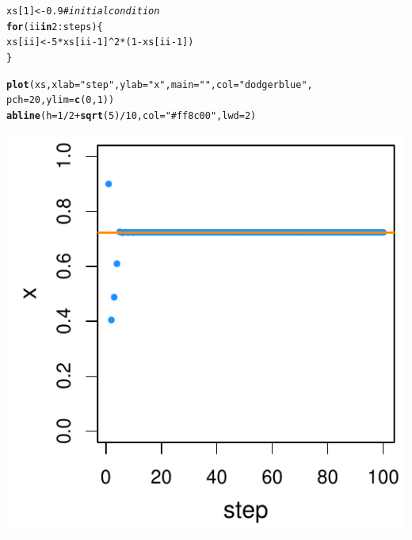 \documentclass[Tutorial]{../cbg}\usepackage[]{graphicx}\usepackage[]{color}
\makeatletter
\def\maxwidth{ %
  \ifdim\Gin@nat@width>\linewidth
    \linewidth
  \else
    \Gin@nat@width
  \fi
}
\newcommand{\hlnum}[1]{\textcolor[rgb]{0.686,0.059,0.569}{#1}}%
\newcommand{\hlstr}[1]{\textcolor[rgb]{0.192,0.494,0.8}{#1}}%
\newcommand{\hlcom}[1]{\textcolor[rgb]{0.678,0.584,0.686}{\textit{#1}}}%
\newcommand{\hlopt}[1]{\textcolor[rgb]{0,0,0}{#1}}%
\newcommand{\hlstd}[1]{\textcolor[rgb]{0.345,0.345,0.345}{#1}}%
\newcommand{\hlkwa}[1]{\textcolor[rgb]{0.161,0.373,0.58}{\textbf{#1}}}%
\newcommand{\hlkwb}[1]{\textcolor[rgb]{0.69,0.353,0.396}{#1}}%
\newcommand{\hlkwc}[1]{\textcolor[rgb]{0.333,0.667,0.333}{#1}}%
\newcommand{\hlkwd}[1]{\textcolor[rgb]{0.737,0.353,0.396}{\textbf{#1}}}%
\newenvironment{kframe}{%
 \def\at@end@of@kframe{}%
 \ifinner\ifhmode%
  \def\at@end@of@kframe{\end{minipage}}%
  \begin{minipage}{\columnwidth}%
 \fi\fi%
 \def\FrameCommand##1{\hskip\@totalleftmargin \hskip-\fboxsep
 \colorbox{shadecolor}{##1}\hskip-\fboxsep
     \hskip-\linewidth \hskip-\@totalleftmargin \hskip\columnwidth}%
 \MakeFramed {\advance\hsize-\width
   \@totalleftmargin\z@ \linewidth\hsize
   \@setminipage}}%
 {\par\unskip\endMakeFramed%
 \at@end@of@kframe}
\newenvironment{knitrout}{}{} %
\makeatother
\begin{document}
\begin{knitrout}
\color{fgcolor}\begin{kframe}
\begin{alltt}
\hlstd{xs[}\hlnum{1}\hlstd{]} \hlkwb{<-} \hlnum{0.9}  \hlcom{# initial condition}
\hlkwa{for} \hlstd{(ii} \hlkwa{in} \hlnum{2}\hlopt{:}\hlstd{steps) \{}
    \hlstd{xs[ii]} \hlkwb{<-} \hlnum{5} \hlopt{*} \hlstd{xs[ii} \hlopt{-} \hlnum{1}\hlstd{]}\hlopt{^}\hlnum{2} \hlopt{*} \hlstd{(}\hlnum{1} \hlopt{-} \hlstd{xs[ii} \hlopt{-} \hlnum{1}\hlstd{])}
\hlstd{\}}
\end{alltt}
\end{kframe}
\end{knitrout}


\begin{knitrout}
\color{fgcolor}\begin{kframe}
\begin{alltt}
\hlkwd{plot}\hlstd{(xs,} \hlkwc{xlab} \hlstd{=} \hlstr{"step"}\hlstd{,} \hlkwc{ylab} \hlstd{=} \hlstr{"x"}\hlstd{,} \hlkwc{main} \hlstd{=} \hlstr{""}\hlstd{,} \hlkwc{col} \hlstd{=} \hlstr{"dodgerblue"}\hlstd{,}
    \hlkwc{pch} \hlstd{=} \hlnum{20}\hlstd{,} \hlkwc{ylim} \hlstd{=} \hlkwd{c}\hlstd{(}\hlnum{0}\hlstd{,} \hlnum{1}\hlstd{))}
\hlkwd{abline}\hlstd{(}\hlkwc{h} \hlstd{=} \hlnum{1}\hlopt{/}\hlnum{2} \hlopt{+} \hlkwd{sqrt}\hlstd{(}\hlnum{5}\hlstd{)}\hlopt{/}\hlnum{10}\hlstd{,} \hlkwc{col} \hlstd{=} \hlstr{"#ff8c00"}\hlstd{,} \hlkwc{lwd} \hlstd{=} \hlnum{2}\hlstd{)}
\end{alltt}
\end{kframe}

{\centering \includegraphics[width=\maxwidth]{figure/minimal-unnamed-chunk-4-1} 

}



\end{knitrout}
\end{document}
